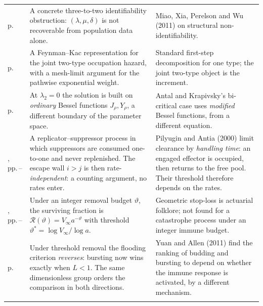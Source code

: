 {\begin{xltabular}{\linewidth}{@{}>{\raggedright\arraybackslash}p{20mm}O>{\raggedright\arraybackslash}p{40mm}@{}}
\newline p.\,\pageref{p:sec:identifiability} &
A concrete three-to-two identifiability obstruction: $(\lambda,\mu,\delta)$ is not
recoverable from population data alone. &
Miao, Xia, Perelson and Wu (2011) on structural non-identifiability. \\
\addlinespace[5pt]

\newline p.\,\pageref{prop:feynman-kac} &
A Feynman--Kac representation for the joint two-type occupation hazard, with a mesh-limit
argument for the pathwise exponential weight. &
Standard first-step decomposition for one type; the joint two-type object is the increment. \\
\addlinespace[5pt]

\newline p.\,\pageref{prop:lambda2-zero} &
At $\lambda_2=0$ the solution is built on \emph{ordinary} Bessel functions
$J_\rho,Y_\rho$, a different boundary of the parameter space. &
Antal and Krapivsky's bi-critical case uses \emph{modified} Bessel functions, from a
different equation. \\
\addlinespace[5pt]

, \newline pp.\,\pageref{path:def:rs}--\pageref{path:prop:certainty} &
A replicator--suppressor process in which suppressors are consumed one-to-one and never
replenished. The escape wall $i>j$ is then rate-\emph{independent}: a counting argument, no
rates enter. &
Pilyugin and Antia (2000) limit clearance by \emph{handling time}: an engaged effector is
occupied, then returns to the free pool. Their threshold therefore depends on the rates. \\
\addlinespace[5pt]

, \newline pp.\,\pageref{path:prop:ratio}--\pageref{path:cor:threshold} &
Under an integer removal budget $\vartheta$, the surviving fraction is
$\mathcal{R}(\vartheta)=V_\infty a^{-\vartheta}$ with threshold
$\vartheta^\ast=\log V_\infty/\log a$. &
Geometric stop-loss is actuarial folklore; not found for a catastrophe process under an
integer immune budget. \\
\addlinespace[5pt]

\newline p.\,\pageref{path:prop:reversal} &
Under threshold removal the flooding criterion \emph{reverses}: bursting now wins exactly
when $L<1$. The same dimensionless group orders the comparison in both directions. &
Yuan and Allen (2011) find the ranking of budding and bursting to depend on whether the immune
response is activated, by a different mechanism. \\
\addlinespace[5pt]


\end{xltabular}}
